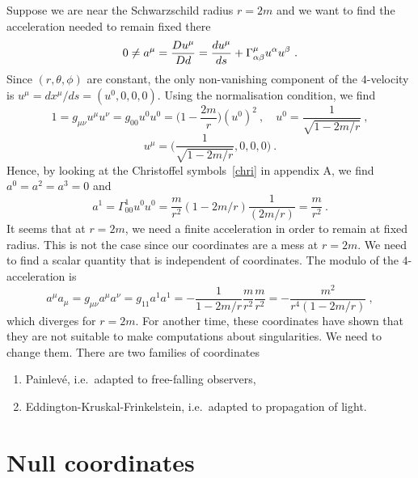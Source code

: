     Suppose we are near the Schwarzschild radius $r = 2m$ and we want to find the acceleration needed to remain fixed there 
    \begin{equation*}
        0 \neq a^\mu = \frac{Du^\mu}{Dd} = \frac{du^\mu}{ds} + \Gamma^\mu_{\alpha\beta} u^\alpha u^\beta ~.
    \end{equation*}
    Since $(r, \theta, \phi)$ are constant, the only non-vanishing component of the $4$-velocity is $u^\mu = dx^\mu / ds = (u^0, 0 ,0 ,0)$. Using the normalisation condition, we find 
    \begin{equation*}
        1 = g_{\mu\nu} u^\mu u^\nu = g_{00} u^0 u^0 = \Big (1 - \frac{2m}{r} \Big) (u^0)^2 ~, \quad u^0 = \frac{1}{\sqrt{1 - 2m / r}} ~,
    \end{equation*}
    \begin{equation*}
        u^\mu = \Big ( \frac{1}{\sqrt{1 - 2m / r}} , 0 , 0, 0 \Big) ~.
    \end{equation*}
    Hence, by looking at the Christoffel symbols~\ref{chri} in appendix A, we find $a^0 = a^2 = a^3 = 0$ and 
    \begin{equation*}
        a^1 = \Gamma^1_{00} u^0 u^0 = \frac{m}{r^2} (1 - 2m / r) \frac{1}{(2m / r)} = \frac{m}{r^2} ~.
    \end{equation*}
    It seems that at $ r = 2m$, we need a finite acceleration in order to remain at fixed radius. This is not the case since our coordinates are a mess at $r = 2m$. We need to find a scalar quantity that is independent of coordinates. The modulo of the $4$-acceleration is 
    \begin{equation*}
        a^\mu a_\mu = g_{\mu\nu} a^\mu a^\nu = g_{11} a^1 a^1 = - \frac{1}{1 - 2m/r} \frac{m}{r^2} \frac{m}{r^2} = - \frac{m^2}{r^4 (1 - 2m/r)} ~,
    \end{equation*}
    which diverges for $r = 2m$. For another time, these coordinates have shown that they are not suitable to make computations about singularities. We need to change them. There are two families of coordinates 
    \begin{enumerate}
        \item Painlevé, i.e.~adapted to free-falling observers, 
        \item Eddington-Kruskal-Frinkelstein, i.e.~adapted to propagation of light. 
    \end{enumerate}

\chapter{Null coordinates}

